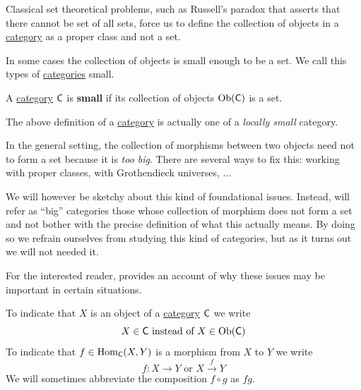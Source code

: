 \documentclass[../../main]{subfiles}
\begin{document}
Classical set theoretical problems, such as Russell's paradox that asserts that there cannot be set of all sets, force us to define the collection of objects in a \hyperref[def:category]{category} as a proper class and not a set.

In some cases the collection of objects is small enough to be a set.
We call this types of \hyperref[def:category]{categories} small.
\begin{definition}\label{def:small-category}
  A \hyperref[def:category]{category} \(\mathsf{C}\) is \textbf{small} if its collection of objects \(\operatorname{Ob}(\mathsf{C})\) is a set.
\end{definition}

\begin{remark}\label{rem:size-issues}
  The above definition of a \hyperref[def:category]{category} is actually one of a \textit{locally small} category.

  In the general setting, the collection of morphisms between two objects need not to form a set because it is \textit{too big}.
  There are several ways to fix this: working with proper classes, with Grothendieck universes, ...
  
  We will however be sketchy about this kind of foundational issues.
  Instead, will refer as ``big'' categories those whose collection of morphism does not form a set and not bother with the precise definition of what this actually means.
  By doing so we refrain ourselves from studying this kind of categories, but as it turns out we will not needed it.

  For the interested reader, \cite[Section 3.7]{riehlCategoryTheoryContext} provides an account of why these issues may be important in certain situations.
\end{remark}

\begin{notation}
  To indicate that \(X\) is an object of a \hyperref[def:category]{category} \(\mathsf{C}\) we write
  \begin{equation*}
    X \in \mathsf{C} \text{ instead of } X \in \operatorname{Ob}(\mathsf{C})
  \end{equation*}
  To indicate that \(f \in \operatorname{Hom}_{\mathsf{C}}(X, Y)\) is a morphism from \(X\) to \(Y\) we write
  \begin{equation*}
    f\colon X \to Y \text{ or } X \xrightarrow{f} Y
  \end{equation*}
  We will sometimes abbreviate the composition \(f \circ g\) as \(fg\).
\end{notation}
\end{document}
